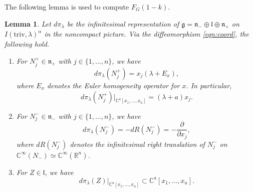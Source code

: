 \documentclass[reqno,11pt]{amsart}
\newtheorem{lem}[equation]{Lemma}
\theoremstyle{remark}
\theoremstyle{definition}
\numberwithin{equation}{section}
\newcommand{\ga}{\alpha}
\newcommand{\fg}{{\mathfrak g}}
\newcommand{\fl}{{\mathfrak l}}
\newcommand{\fn}{{\mathfrak n}}
\newcommand{\R}{\mathbb{R}}
\newcommand{\C}{\mathbb{C}}
\newcommand{\triv}{\mathrm{triv}}
\newcommand{\dpi}{d\pi}
\begin{document}
The following lemma is used to compute $F_G(1-k)$.

\begin{lem}\label{lem:dpi}
Let $\dpi_{\lambda}$ be the infinitesimal representation of 
$\fg= \fn_-\oplus\fl \oplus \fn_+$ on 
$I(\triv, \lambda)^\ga$ in the noncompact picture. 
Via the diffeomorphism \eqref{eqn:coord},
the following hold.
\begin{enumerate}
\item[\emph{(1)}] For $N_j^+ \in \fn_+$ with $j \in \{1,\ldots, n\}$, we have
\begin{equation*}
\dpi_{\lambda}(N_j^+) = x_j(\lambda + E_x),
\end{equation*}
where $E_x$ denotes the Euler homogeneity operator for $x$. In particular,
\begin{equation*}
\dpi_{\lambda}(N_j^+)\vert_{\C^a[x_1,\ldots, x_n]} = (\lambda +a) x_j.
\end{equation*}
\vskip 0.1in

\item[\emph{(2)}] For $N_j^- \in \fn_-$ with $j \in \{1,\ldots, n\}$, we have
\begin{equation*}
\dpi_{\lambda}(N_j^-)=-dR(N_j^-)=-\frac{\partial}{\partial x_j},
\end{equation*}
where $dR(N_j^-)$ denotes the infinitesimal right translation of $N_j^-$ on
$\C^\infty(N_-)\simeq \C^\infty(\R^n)$.

\vskip 0.1in

\item[\emph{(3)}] For $Z \in \fl$, we have
\begin{equation*}
\dpi_{\lambda}(Z)\vert_{\C^a[x_1,\ldots, x_n]} \subset \C^a[x_1,\ldots, x_n].
\end{equation*}


\end{enumerate}
\end{lem}
\end{document}
